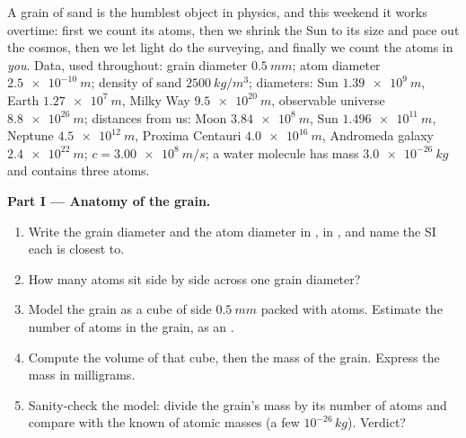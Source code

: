 \begin{problem}
\label{pb:g10:orders-of-magnitude:1}
A grain of sand is the humblest object in physics, and this weekend it
works overtime: first we count its atoms, then we shrink the Sun to
its size and pace out the cosmos, then we let light do the surveying,
and finally we count the atoms in \emph{you}. Data, used throughout:
grain diameter $\qty{0.5}{mm}$; atom diameter $\qty{2.5e-10}{m}$;
density of sand $\qty{2500}{kg/m^3}$; diameters: Sun
$\qty{1.39e9}{m}$, Earth $\qty{1.27e7}{m}$, Milky Way
$\qty{9.5e20}{m}$, observable universe $\qty{8.8e26}{m}$; distances
from us: Moon $\qty{3.84e8}{m}$, Sun $\qty{1.496e11}{m}$, Neptune
$\qty{4.5e12}{m}$, Proxima Centauri $\qty{4.0e16}{m}$, Andromeda
galaxy $\qty{2.4e22}{m}$; $c = \qty{3.00e8}{m/s}$; a water molecule
has mass $\qty{3.0e-26}{kg}$ and contains three atoms.

\medskip
\noindent\textbf{Part I --- Anatomy of the grain.}
\begin{enumerate}
  \item Write the grain diameter and the atom diameter in , in
        , and name the SI  each is closest
        to.
  \item How many atoms sit side by side across one grain diameter?
  \item Model the grain as a cube of side $\qty{0.5}{mm}$ packed with
        atoms. Estimate the number of atoms in the grain, as an .
  \item Compute the volume of that cube, then the mass of the grain.
        Express the mass in milligrams.
  \item Sanity-check the model: divide the grain's mass by its number
        of atoms and compare with the known  of
        atomic masses (a few $10^{-26}\,\unit{kg}$). Verdict?
\end{enumerate}


\end{problem}
